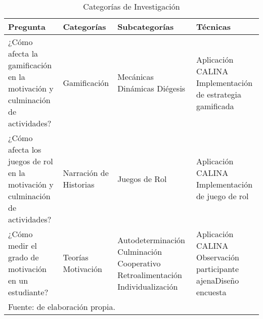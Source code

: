 \begin{table}[ht]
\caption{Categorías de Investigación}
\label{tab:catinv}
\small
\begin{center}
	\begin{tabular}{ p{40mm} p{30mm} p{30mm} p{40mm}}
\toprule
\textbf{Pregunta} & \textbf{Categorías} & \textbf{Subcategorías} & \textbf{Técnicas} \\ 
\midrule
¿Cómo afecta la gamificación en la motivación y culminación de actividades? & Gamificación & Mecánicas 
	\newline Dinámicas \newline Diégesis & Aplicación CALINA \newline Implementación de estrategia 
	gamificada\\
¿Cómo afecta los juegos de rol en la motivación y culminación de actividades? & Narración de Historias & 
	Juegos de Rol & Aplicación CALINA \newline Implementación de juego de rol\\
¿Cómo medir el grado de motivación en un estudiante? & Teorías Motivación & Autodeterminación \newline 
	Culminación \newline Cooperativo \newline Retroalimentación \newline Individualización & Aplicación 
	CALINA \newline Observación participante ajena\newline Diseño encuesta\\
\bottomrule
\multicolumn{4}{l}{\footnotesize Fuente: de elaboración propia.}\\
\end{tabular}
\end{center}
\end{table}

